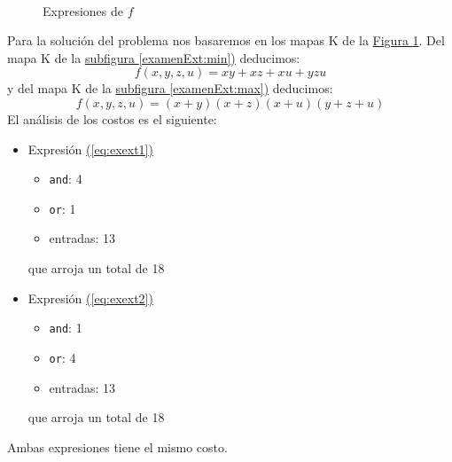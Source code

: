 \begin{solution}
  \begin{figure}
    \centering
    \mbox{
      \qquad
    }
    \caption{\label{examenExt:total} Expresiones de $f$}
  \end{figure}
  Para la solución del problema nos basaremos en los mapas K de la
  \hyperref[examen:total]{Figura \ref*{examenExt:total}}. Del mapa K de
  la \hyperref[examen:min]{subfigura \ref*{examenExt:min})} deducimos:
  \begin{equation}
    \label{eq:exext1}
    f(x,y,z,u)=xy+xz+xu+yzu
  \end{equation}
  y del mapa K de
  la \hyperref[examen:max]{subfigura \ref*{examenExt:max})} deducimos:
  \begin{equation}
    \label{eq:exext2}
    f(x,y,z,u)=(x+y)(x+z)(x+u)(y+z+u)
  \end{equation}
  El análisis de los costos es el siguiente:
  \begin{itemize}
  \item Expresión \hyperref[eq:exext1]{(\ref*{eq:exext1})}
    \begin{itemize}
    \item \texttt{and}: 4
    \item \texttt{or}: 1
    \item entradas: 13
    \end{itemize}
    que arroja un total de 18
  \item Expresión \hyperref[eq:exext2]{(\ref*{eq:exext2})}
    \begin{itemize}
    \item \texttt{and}: 1
    \item \texttt{or}: 4
    \item entradas: 13
    \end{itemize}
    que arroja un total de 18
  \end{itemize}
  Ambas expresiones tiene el mismo costo.
\end{solution}

